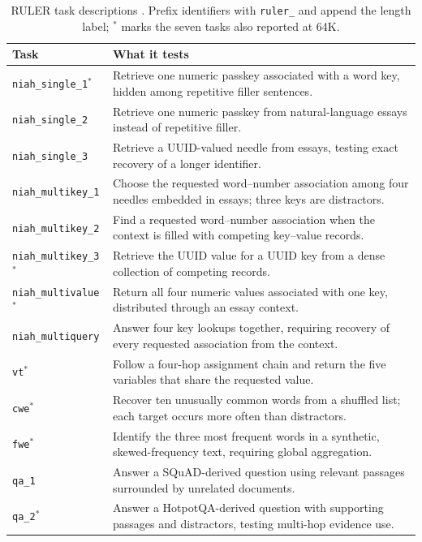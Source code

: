 \begin{table}[!ht]
\centering
\caption{RULER task descriptions \citep{hsieh2024ruler,nvidia2024rulerconfig}. Prefix identifiers with \texttt{ruler\_} and append the length label; $^{*}$ marks the seven tasks also reported at 64K.}
\label{tab:ruler-task-guide}
\small
\setlength{\tabcolsep}{4pt}
\renewcommand{\arraystretch}{1.18}
\begin{tabular}{@{}>{\raggedright\arraybackslash}p{1.20in}>{\raggedright\arraybackslash}p{4.13in}@{}}
\hline
Task & What it tests \\
\hline
\texttt{niah\_single\_1}$^{*}$ & Retrieve one numeric passkey associated with a word key, hidden among repetitive filler sentences. \\
\texttt{niah\_single\_2} & Retrieve one numeric passkey from natural-language essays instead of repetitive filler. \\
\texttt{niah\_single\_3} & Retrieve a UUID-valued needle from essays, testing exact recovery of a longer identifier. \\
\texttt{niah\_multikey\_1} & Choose the requested word--number association among four needles embedded in essays; three keys are distractors. \\
\texttt{niah\_multikey\_2} & Find a requested word--number association when the context is filled with competing key--value records. \\
\texttt{niah\_multikey\_3}$^{*}$ & Retrieve the UUID value for a UUID key from a dense collection of competing records. \\
\texttt{niah\_multivalue}$^{*}$ & Return all four numeric values associated with one key, distributed through an essay context. \\
\texttt{niah\_multiquery} & Answer four key lookups together, requiring recovery of every requested association from the context. \\
\texttt{vt}$^{*}$ & Follow a four-hop assignment chain and return the five variables that share the requested value. \\
\texttt{cwe}$^{*}$ & Recover ten unusually common words from a shuffled list; each target occurs more often than distractors. \\
\texttt{fwe}$^{*}$ & Identify the three most frequent words in a synthetic, skewed-frequency text, requiring global aggregation. \\
\texttt{qa\_1} & Answer a SQuAD-derived question using relevant passages surrounded by unrelated documents. \\
\texttt{qa\_2}$^{*}$ & Answer a HotpotQA-derived question with supporting passages and distractors, testing multi-hop evidence use. \\
\hline
\end{tabular}
\end{table}

